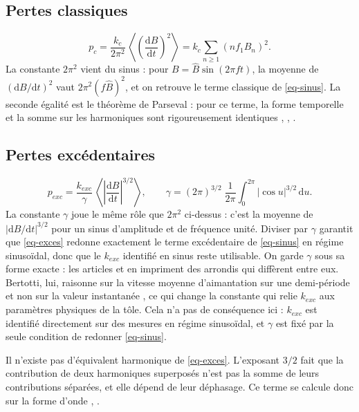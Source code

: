 \documentclass[11pt,a4paper]{article}
\newcommand{\dd}{\mathrm{d}}
\newcommand{\moy}[1]{\left\langle #1 \right\rangle}
\newcommand{\Bc}{\hat{B}}
\begin{document}
\subsection{Pertes classiques}
\begin{equation}
    p_c = \frac{k_c}{2\pi^2}\,\moy{\left(\frac{\dd B}{\dd t}\right)^{2}} = k_c \sum_{n\ge 1} \left(n f_1 B_n\right)^{2}.
    \label{eq-classique}
\end{equation}
La constante $2\pi^2$ vient du sinus : pour $B = \Bc\sin(2\pi f t)$, la moyenne de $(\dd B/\dd t)^2$ vaut $2\pi^2 (f\Bc)^2$, et on retrouve le terme classique de \eqref{eq-sinus}. La seconde égalité est le théorème de Parseval : pour ce terme, la forme temporelle et la somme sur les harmoniques sont rigoureusement identiques \cite[Eq.~7]{Fio90}, \cite[Eq.~3]{Lav78}, \cite[Eq.~3]{Yam10}.

\subsection{Pertes excédentaires}
\begin{equation}
    p_{exc} = \frac{k_{exc}}{\gamma}\,\moy{\left|\frac{\dd B}{\dd t}\right|^{3/2}},
    \qquad
    \gamma = (2\pi)^{3/2}\;\frac{1}{2\pi}\int_0^{2\pi} |\cos u|^{3/2}\,\dd u.
    \label{eq-exces}
\end{equation}
La constante $\gamma$ joue le même rôle que $2\pi^2$ ci-dessus : c'est la moyenne de $|\dd B/\dd t|^{3/2}$ pour un sinus d'amplitude et de fréquence unité. Diviser par $\gamma$ garantit que \eqref{eq-exces} redonne exactement le terme excédentaire de \eqref{eq-sinus} en régime sinusoïdal, donc que le $k_{exc}$ identifié en sinus reste utilisable. On garde $\gamma$ sous sa forme exacte : les articles \cite[Eq.~15]{Fio90} et \cite[Eq.~4]{Ama95} en impriment des arrondis qui diffèrent entre eux. Bertotti, lui, raisonne sur la vitesse moyenne d'aimantation sur une demi-période et non sur la valeur instantanée \cite[Eq.~9]{Ber88}, ce qui change la constante qui relie $k_{exc}$ aux paramètres physiques de la tôle. Cela n'a pas de conséquence ici : $k_{exc}$ est identifié directement sur des mesures en régime sinusoïdal, et $\gamma$ est fixé par la seule condition de redonner \eqref{eq-sinus}.

Il n'existe pas d'équivalent harmonique de \eqref{eq-exces}. L'exposant $3/2$ fait que la contribution de deux harmoniques superposés n'est pas la somme de leurs contributions séparées, et elle dépend de leur déphasage. Ce terme se calcule donc sur la forme d'onde \cite[Eq.~13 et 14]{Fio90}, \cite[Eq.~10]{Ama95}.
\end{document}
